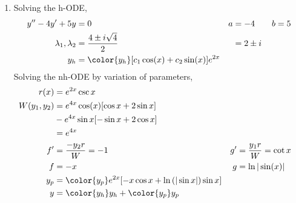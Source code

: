 \begin{enumerate}
    \item Solving the h-ODE,
          \begin{align}
              y'' - 4y' + 5y           & = 0                          &
              a                        & = -4 \qquad b = 5              \\
              \lambda_{1}, \lambda_{2} & = \frac{4 \pm i\sqrt{4}}{2}  &
                                       & = 2 \pm i                      \\
              y_{h}                    & = {\color{y_h} [c_{1}\cos(x)
                  + c_{2}\sin(x)]e^{2x}}
          \end{align}
          Solving the nh-ODE by variation of parameters,
          \begin{align}
              r(x)            & = e^{2x}\csc x                                \\
              W(y_{1}, y_{2}) & = e^{4x}\cos(x)[\cos x + 2\sin x]             \\
                              & - e^{4x}\sin x[-\sin x + 2\cos x]             \\
                              & = e^{4x}                                      \\
              f'              & = \frac{-y_{2}r}{W} = -1                    &
              g'              & = \frac{y_{1}r}{W} = \cot x                   \\
              f               & = -x                                        &
              g               & = \ln|\sin(x)|                                \\
              y_{p}           & = {\color{y_p} e^{2x}[-x\cos x
              + \ln\left( |\sin x| \right) \sin x]}                           \\
              y               & = {\color{y_h} y_{h}} + {\color{y_p} y_{p}}
          \end{align}


\end{enumerate}
